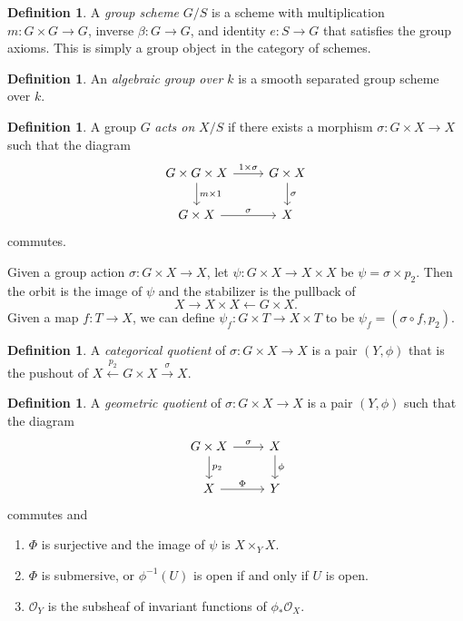 \documentclass[leqno, openany]{memoir}
\theoremstyle{definition}
\newtheorem{defn}[thm]{Definition}
\theoremstyle{remark}
\theoremstyle{plain}
\theoremstyle{definition}
\theoremstyle{remark}
\newcommand{\mc}[1]{\mathcal{#1}}
\begin{document}
\begin{defn}
    A \textit{group scheme}  $G / S$ is a scheme with multiplication $m \colon G \times G \to G$, inverse $\beta \colon G \to G$, and identity $e \colon S \to G$ that satisfies the group axioms. This is simply a group object in the category of schemes.
\end{defn}

\begin{defn}
    An \textit{algebraic group over $k$}  is a smooth separated group scheme over $k$.
\end{defn}

\begin{defn}
    A group $G$ \textit{acts on} $X / S$ if there exists a morphism $\sigma \colon G \times X \to X$ such that the diagram
    \begin{equation}
    \begin{tikzcd}
        G \times G \times X \arrow{r}{1 \times \sigma} \arrow{d}{m \times 1} & G \times X \arrow{d}{\sigma} \\
        G \times X \arrow{r}{\sigma} & X
    \end{tikzcd}
    \end{equation}
    commutes.
\end{defn}

Given a group action $\sigma \colon G \times X \to X$, let $\psi \colon G \times X \to X \times X$ be $\psi = \sigma \times p_2$. Then the orbit is the image of $\psi$ and the stabilizer is the pullback of
\[ X \to X \times X \gets G \times X. \]
Given a map $f \colon T \to X$, we can define $\psi_f \colon G \times T \to X \times T$ to be $\psi_f = (\sigma \circ f, p_2)$.

\begin{defn}
    A \textit{categorical quotient} of $\sigma \colon G \times X \to X$ is a pair $(Y, \phi)$ that is the pushout of $X \xleftarrow{p_2} G \times X \xrightarrow{\sigma} X$.
\end{defn}

\begin{defn}
    A \textit{geometric quotient} of $\sigma \colon G \times X \to X$ is a pair $(Y, \phi)$ such that the diagram
    \begin{equation}
    \begin{tikzcd}
        G \times X \arrow{r}{\sigma} \arrow{d}{p_2} & X \arrow{d}{\phi} \\
        X \arrow{r}{\Phi} & Y
    \end{tikzcd}
    \end{equation}
    commutes and
    \begin{enumerate}[label=(\arabic*)]
        \item $\Phi$ is surjective and the image of $\psi$ is $X \times_Y X$.
        \item $\Phi$ is submersive, or $\phi^{-1}(U)$ is open if and only if $U$ is open.
        \item $\mc{O}_Y$ is the subsheaf of invariant functions of $\phi_* \mc{O}_X$.
    \end{enumerate}
\end{defn}
\end{document}
